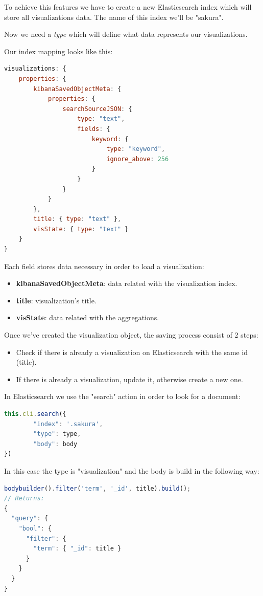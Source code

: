 \documentclass[a4paper, 12pt, english]{book}
\begin{document}
To achieve this features we have to create a new Elasticsearch index which will store all visualizations data. The name of this index we'll be "sakura".

Now we need a \textit{type} which will define what data represents our visualizations.

Our index mapping looks like this:
\begin{lstlisting}[language=javascript]
visualizations: {
    properties: {
        kibanaSavedObjectMeta: {
            properties: {
                searchSourceJSON: {
                    type: "text",
                    fields: {
                        keyword: {
                            type: "keyword",
                            ignore_above: 256
                        }
                    }
                }
            }
        },
        title: { type: "text" },
        visState: { type: "text" }
    }
}
\end{lstlisting}

Each field stores data necessary in order to load a visualization:
\begin{itemize}
    \item \textbf{kibanaSavedObjectMeta}: data related with the visualization index.
    \item \textbf{title}: visualization's title.
    \item \textbf{visState}: data related with the aggregations.
\end{itemize}

Once we've created the visualization object, the saving process consist of 2 steps:
\begin{itemize}
    \item Check if there is already a visualization on Elasticsearch with the same id (title).
    \item If there is already a visualization, update it, otherwise create a new one.
\end{itemize}

In Elasticsearch we use the "search" action in order to look for a document:
\begin{lstlisting}[language=javascript]
this.cli.search({
		"index": '.sakura',
		"type": type,
		"body": body
})
\end{lstlisting}

In this case the type is "visualization" and the body is build in the following way:
\begin{lstlisting}[language=javascript]
bodybuilder().filter('term', '_id', title).build();
// Returns:
{
  "query": {
    "bool": {
      "filter": {
        "term": { "_id": title }
      }
    }
  }
}
\end{lstlisting}
\end{document}
